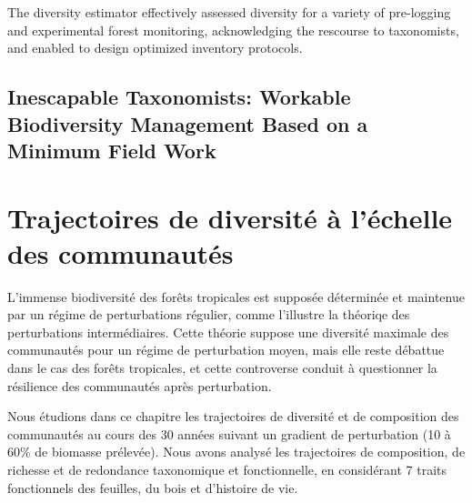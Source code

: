 \documentclass[
  11pt,
  french,
  A4paper,
  extrafontsizes,onecolumn,openright
  ]{memoir}
\begin{document}
The diversity estimator effectively assessed diversity for a variety of
pre-logging and experimental forest monitoring, acknowledging the
rescourse to taxonomists, and enabled to design optimized inventory
protocols.

\newpage

\section*{Inescapable Taxonomists: Workable Biodiversity Management
Based on a Minimum Field
Work}\label{inescapable-taxonomists-workable-biodiversity-management-based-on-a-minimum-field-work}

\newpage

\chapter{Trajectoires de diversité à l'échelle des
communautés}\label{trajectoires-de-diversite-a-lechelle-des-communautes}

L'immense biodiversité des forêts tropicales est supposée déterminée et
maintenue par un régime de perturbations régulier, comme l'illustre la
théoriqe des perturbations intermédiaires. Cette théorie suppose une
diversité maximale des communautés pour un régime de perturbation moyen,
mais elle reste débattue dans le cas des forêts tropicales, et cette
controverse conduit à questionner la résilience des communautés après
perturbation.

Nous étudions dans ce chapitre les trajectoires de diversité et de
composition des communautés au cours des 30 années suivant un gradient
de perturbation (10 à 60\% de biomasse prélevée). Nous avons analysé les
trajectoires de composition, de richesse et de redondance taxonomique et
fonctionnelle, en considérant 7 traits fonctionnels des feuilles, du
bois et d'histoire de vie.
\end{document}
